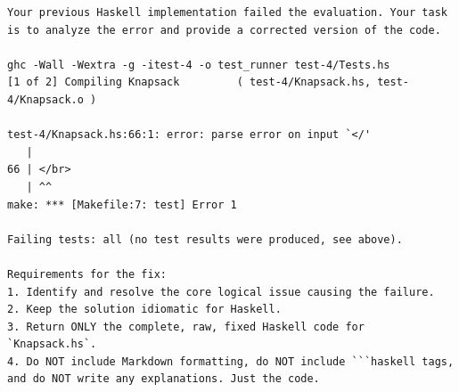 \begin{lstlisting}[style=prompt,caption={Prompt naprawczy wysłany po błędzie kompilacji w zadaniu 4 w Haskellu (próba 1).},label={lst:followup-real}]
Your previous Haskell implementation failed the evaluation. Your task is to analyze the error and provide a corrected version of the code.

ghc -Wall -Wextra -g -itest-4 -o test_runner test-4/Tests.hs
[1 of 2] Compiling Knapsack         ( test-4/Knapsack.hs, test-4/Knapsack.o )

test-4/Knapsack.hs:66:1: error: parse error on input `</'
   |
66 | </br>
   | ^^
make: *** [Makefile:7: test] Error 1

Failing tests: all (no test results were produced, see above).

Requirements for the fix:
1. Identify and resolve the core logical issue causing the failure.
2. Keep the solution idiomatic for Haskell.
3. Return ONLY the complete, raw, fixed Haskell code for `Knapsack.hs`.
4. Do NOT include Markdown formatting, do NOT include ```haskell tags, and do NOT write any explanations. Just the code.
\end{lstlisting}
